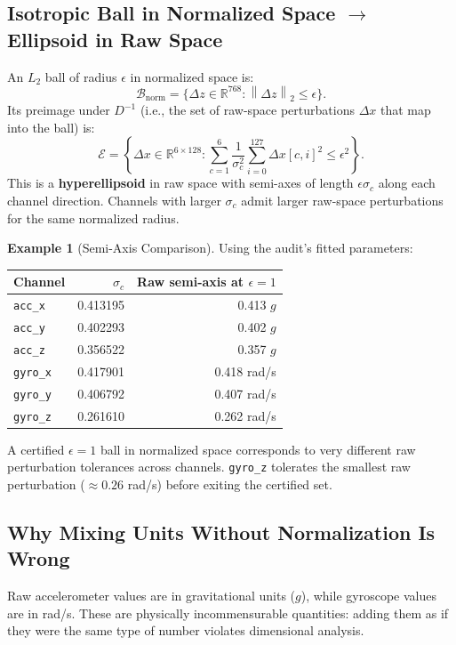 \documentclass[11pt, a4paper]{article}
\theoremstyle{definition}
\newtheorem{example}{Example}[section]
\theoremstyle{plain}
\newcommand{\R}{\mathbb{R}}
\newcommand{\norm}[2]{\left\|#1\right\|_{#2}}
\newcommand{\code}[1]{\texttt{#1}}
\begin{document}
\subsection{Isotropic Ball in Normalized Space $\to$ Ellipsoid in Raw Space}

An $L_2$ ball of radius $\epsilon$ in normalized space is:
\[
  \mathcal{B}_{\text{norm}} = \bigl\{ \Delta z \in \R^{768} : \norm{\Delta z}{2} \le \epsilon \bigr\}.
\]
Its preimage under $D^{-1}$ (i.e., the set of raw-space perturbations $\Delta x$
that map into the ball) is:
\[
  \mathcal{E} = \left\{ \Delta x \in \R^{6 \times 128} :
    \sum_{c=1}^6 \frac{1}{\sigma_c^2} \sum_{i=0}^{127} \Delta x[c,i]^2 \le \epsilon^2 \right\}.
\]
This is a \textbf{hyperellipsoid} in raw space with semi-axes of length
$\epsilon \sigma_c$ along each channel direction. Channels with larger $\sigma_c$
admit larger raw-space perturbations for the same normalized radius.

\begin{example}[Semi-Axis Comparison]
  Using the audit's fitted parameters:
  \begin{center}
  \small
  \begin{tabular}{@{}lrr@{}}
  \toprule
  Channel & $\sigma_c$ & Raw semi-axis at $\epsilon = 1$ \\
  \midrule
  \code{acc\_x} & 0.413195 & 0.413 $g$ \\
  \code{acc\_y} & 0.402293 & 0.402 $g$ \\
  \code{acc\_z} & 0.356522 & 0.357 $g$ \\
  \code{gyro\_x} & 0.417901 & 0.418 rad/s \\
  \code{gyro\_y} & 0.406792 & 0.407 rad/s \\
  \code{gyro\_z} & 0.261610 & 0.262 rad/s \\
  \bottomrule
  \end{tabular}
  \end{center}
  A certified $\epsilon = 1$ ball in normalized space corresponds to very different
  raw perturbation tolerances across channels. \code{gyro\_z} tolerates the smallest
  raw perturbation ($\approx 0.26$ rad/s) before exiting the certified set.
\end{example}

\subsection{Why Mixing Units Without Normalization Is Wrong}

Raw accelerometer values are in gravitational units ($g$), while gyroscope values
are in rad/s. These are physically incommensurable quantities: adding them as if
they were the same type of number violates dimensional analysis.
\end{document}
